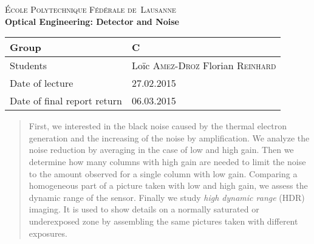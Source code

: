 \begin{titlepage}
\begin{center}
    \textsc{\LARGE École Polytechnique Fédérale de~Lausanne}\\[1.5cm] 
    {\huge \bfseries Optical Engineering: Detector and Noise}\\[0.4cm] 
    \begin{tabular}{|p{5cm}|p{4cm}|}
        \hline
        Group & C \\ \hline
        Students & Loïc \textsc{Amez-Droz} \newline Florian \textsc{Reinhard} \\ \hline
        Date of lecture & 27.02.2015 \\ \hline
        Date of final report return & 06.03.2015 \\ \hline
    \end{tabular}
\end{center}


\begin{abstract}
First, we interested in the black noise caused by the thermal electron generation and the increasing of the noise by amplification.
We analyze the noise reduction by averaging in the case of low and high gain.
Then we determine how many columns with high gain are needed to limit the noise to the amount observed for a single column with low gain.
Comparing a homogeneous part of a picture taken with low and high gain, we assess the dynamic range of the sensor.
Finally we study \emph{high dynamic range} (HDR) imaging.
It is used to show details on a normally saturated or underexposed zone by assembling the same pictures taken with different exposures.
\end{abstract}
 
\vfill
\end{titlepage}
